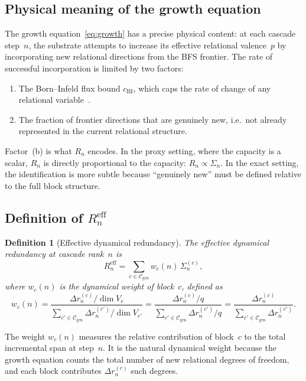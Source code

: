 \documentclass[11pt,a4paper]{article}
\newtheorem{definition}[theorem]{Definition}
\newcommand{\Rn}{R_n}
\newcommand{\Reff}{R_n^{\mathrm{eff}}}
\begin{document}
\subsection{Physical meaning of the growth equation}

The growth equation~\eqref{eq:growth} has a precise physical content:
at each cascade step~$n$, the substrate attempts to increase its
effective relational valence~$p$ by incorporating new relational
directions from the BFS frontier.
The rate of successful incorporation is limited by two factors:
\begin{enumerate}[label=(\alph*)]
\item The Born--Infeld flux bound $c_{\mathrm{BI}}$, which caps the rate
of change of any relational variable~\cite{Beau2026a8}.
\item The fraction of frontier directions that are genuinely
new, i.e.\ not already represented in the current relational
structure.
\end{enumerate}
Factor~(b) is what $\Rn$ encodes.
In the proxy setting, where the capacity is a scalar, $\Rn$ is
directly proportional to the capacity: $\Rn \propto \Sigma_n$.
In the exact setting, the identification is more subtle because
``genuinely new'' must be defined relative to the full block structure.

\subsection{Definition of \texorpdfstring{$\Reff$}{R\_eff}}

\begin{definition}[Effective dynamical redundancy]
\label{def:Reff}
The effective dynamical redundancy at cascade rank~$n$ is
\begin{equation}
\label{eq:Reffdef}
\Reff = \sum_{c \in \mathcal{C}_{\mathrm{gen}}}
w_c(n) \, \Sigma_n^{(c)},
\end{equation}
where $w_c(n)$ is the dynamical weight of block~$c$, defined as
\begin{equation}
\label{eq:weights}
w_c(n)
= \frac{\Delta r_n^{(c)} / \dim V_c}
{\sum_{c'\in\mathcal{C}_{\mathrm{gen}}} \Delta r_n^{(c')} / \dim V_{c'}}
= \frac{\Delta r_n^{(c)} / q}
{\sum_{c'\in\mathcal{C}_{\mathrm{gen}}} \Delta r_n^{(c')} / q}
= \frac{\Delta r_n^{(c)}}{\sum_{c'\in\mathcal{C}_{\mathrm{gen}}} \Delta r_n^{(c')}}.
\end{equation}
\end{definition}

The weight $w_c(n)$ measures the relative contribution of block~$c$
to the total incremental span at step~$n$.
It is the natural dynamical weight because the growth equation
counts the total number of new relational degrees of freedom,
and each block contributes $\Delta r_n^{(c)}$ such degrees.
\end{document}
